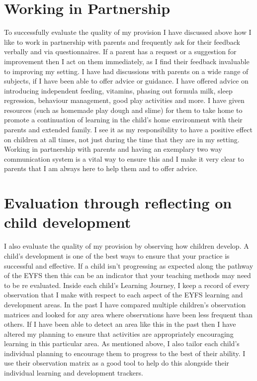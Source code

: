 \documentclass[10pt,a4paper]{report}
\begin{document}
\section{Working in Partnership}

To successfully evaluate the quality of my provision I have discussed above how I like to work in partnership with parents and frequently ask for their feedback verbally and via questionnaires. If a parent has a request or a suggestion for improvement then I act on them immediately, as I find their feedback invaluable to improving my setting. I have had discussions with parents on a wide range of subjects, if I have been able to offer advice or guidance. I have offered advice on introducing independent feeding, vitamins, phasing out formula milk, sleep regression, behaviour management, good play activities and more. I have given resources (such as homemade play dough and slime) for them to take home to promote a continuation of learning in the child's home environment with their parents and extended family. I see it as my responsibility to have a positive effect on children at all times, not just during the time that they are in my setting. Working in partnership with parents and having an exemplary two way communication system is a vital way to ensure this and I make it very clear to parents that I am always here to help them and to offer advice. 

\section{Evaluation through reflecting on child development}

I also evaluate the quality of my provision by observing how children develop. A child's development is one of the best ways to ensure that your practice is successful and effective. If a child isn't progressing as expected along the pathway of the EYFS then this can be an indicator that your teaching methods may need to be re evaluated. Inside each child's Learning Journey, I keep a record of every observation that I make with respect to each aspect of the EYFS learning and development areas. In the past I have compared multiple children's observation matrices and looked for any area where observations have been less frequent than others. If I have been able to detect an area like this in the past then I have altered my planning to ensure that activities are appropriately encouraging learning in this particular area. As mentioned above, I also tailor each child's individual planning to encourage them to progress to the best of their ability. I use their observation matrix as a good tool to help do this alongside their individual learning and development trackers.
\end{document}
